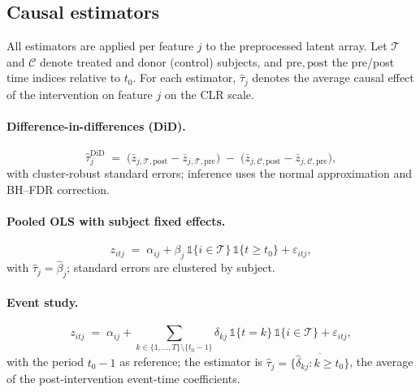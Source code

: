 \documentclass[11pt]{article}
\begin{document}
\subsection{Causal estimators}\label{sec:estimators}

All estimators are applied per feature $j$ to the preprocessed latent array. Let
$\mathcal{T}$ and $\mathcal{C}$ denote treated and donor (control) subjects, and $\mathrm{pre},
\mathrm{post}$ the pre/post time indices relative to $t_0$. For each estimator, $\hat\tau_j$ denotes
the average causal effect of the intervention on feature $j$ on the CLR scale.

\paragraph{Difference-in-differences (DiD).}
\begin{equation}\label{eq:did}
\hat\tau_j^{\mathrm{DiD}} \;=\;
\big(\bar z_{j,\mathcal{T},\mathrm{post}}-\bar z_{j,\mathcal{T},\mathrm{pre}}\big)
\;-\;
\big(\bar z_{j,\mathcal{C},\mathrm{post}}-\bar z_{j,\mathcal{C},\mathrm{pre}}\big),
\end{equation}
with cluster-robust standard errors; inference uses the normal approximation and BH--FDR
correction.

\paragraph{Pooled OLS with subject fixed effects.}
\begin{equation}\label{eq:ols}
z_{itj} \;=\; \alpha_{ij} + \beta_j\,\mathbb{1}\{i\in\mathcal{T}\}\,\mathbb{1}\{t\ge t_0\}
+ \varepsilon_{itj},
\end{equation}
with $\hat\tau_j = \hat\beta_j$; standard errors are clustered by subject.

\paragraph{Event study.}
\begin{equation}\label{eq:es}
z_{itj} \;=\; \alpha_{ij} + \sum_{k\in\{1,\dots,T\}\setminus\{t_0-1\}}
\delta_{kj}\,\mathbb{1}\{t=k\}\,\mathbb{1}\{i\in\mathcal{T}\} + \varepsilon_{itj},
\end{equation}
with the period $t_0-1$ as reference; the estimator is $\hat\tau_j = \overline{\{\hat\delta_{kj}: k\ge
t_0\}}$, the average of the post-intervention event-time coefficients.
\end{document}
